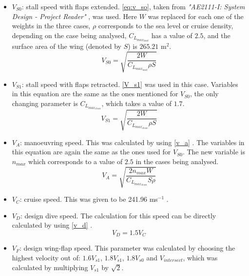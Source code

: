 \begin{itemize}
    \item $V_{S0}$: stall speed with flaps extended. \autoref{eq:v_so}, taken from \textit{"AE2111-I: System Design - Project Reader" } \cite{Timmer2024AE2111-IReader}, was used. Here $W$ was replaced for each one of the weights in the three cases, $\rho$ corresponds to the sea level or cruise density, depending on the case being analysed, $C_{L_{max _{land}}}$ has a value of $2.5$, and the surface area of the wing (denoted by $S$) is $265.21$ m$^2$. %
    \begin{equation}
    \label{eq:v_so}
        V_{S0} = \sqrt{\frac{2W}{C_{L_{max _{land}}} \rho S}} 
    \end{equation}
    \item $V_{S1}$: stall speed with flaps retracted. \autoref{V_s1} \cite{Timmer2024AE2111-IReader} was used in this case. Variables in this equation are the same as the ones mentioned for $V_{S0}$, the only changing parameter is $C_{L_{max _{clean}}}$, which takes a value of $1.7$.
    \begin{equation}
    \label{V_s1}
         V_{S1} = \sqrt{\frac{2W}{C_{L_{max _{clean}}} \rho S}}
    \end{equation}
    \item $V_A$: manoeuvring speed. This was calculated by using \autoref{v_a} \cite{Timmer2024AE2111-IReader}. The variables in this equation are again the same as the ones used for $V_{S0}$. The new variable is $n_{max}$ which corresponds to a value of $2.5$ in the cases being analysed. 
    \begin{equation}
    \label{v_a}
        V_A = \sqrt{\frac{2n_{max}W}{C_{L_{max_{clean}}}S\rho}}
    \end{equation}
    \item $V_C$: cruise speed. This was given to be 241.96 ms$^{-1}$ \cite{Timmer2024AE2111-IReader}.
    \item $V_D$: design dive speed. The calculation for this speed can be directly calculated by using \autoref{v_d} \cite{Timmer2024AE2111-IReader}.
    \begin{equation}
    \label{v_d}
        V_D = 1.5V_C
    \end{equation}
    
    \item $V_F$: design wing-flap speed. This parameter was calculated by choosing the highest velocity out of: $1.6V_{s1}$, $1.8V_{s1}$, $1.8V_{s0}$ and $V_{intersect}$, which was calculated by multiplying $V_{s1}$ by $\sqrt{2}$.
    

\end{itemize}
